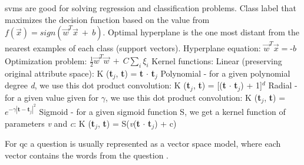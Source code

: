 \gls{svm}s are good for solving regression and classification problems.
Class label that maximizes the decision function based on the value from $f(\vec{x}) = sign(\vec{w}^{T}\vec{x}~+~b)$.
Optimal hyperplane is the one most distant from the nearest examples of each class (support vectors).
Hyperplane equation: $\vec{w}^{T}\vec{x} = \textit{-b}$
Optimization problem: $\frac{1}{2}\vec{w}^{T}\vec{w}~+~C\sum_{i}\xi_{i}$
Kernel functions:
Linear (preserving original attribute space): 
K (\textbf{t}$_{j}$, \textbf{t}) = \textbf{t} $ \cdot$ \textbf{t}$_{j}$
Polynomial - for a given polynomial degree \textit{d}, we use this dot product convolution: 
K (\textbf{t}$_{j}$, \textbf{t}) = [(\textbf{t} $ \cdot$ \textbf{t}$_{j}$) + 1]$^{d}$
Radial - for a given value given for $\gamma$, we use this dot product convolution: 
K (\textbf{t}$_{j}$, \textbf{t}) = $e^{-\gamma|\textbf{t}-\textbf{t}_{j}|^{2}}$
Sigmoid - for a given sigmoid function S, we get a kernel function of parameters \textit{v} and \textit{c}: 
K (\textbf{t}$_{j}$, \textbf{t}) = S(\textit{v}(\textbf{t} $ \cdot$ \textbf{t}$_{j}$) + c)
\cite{Kononenko2007} 







For \gls{qc} a question is usually represented as a vector space model, where each vector contains the words from the question \cite{Loni2011}.















